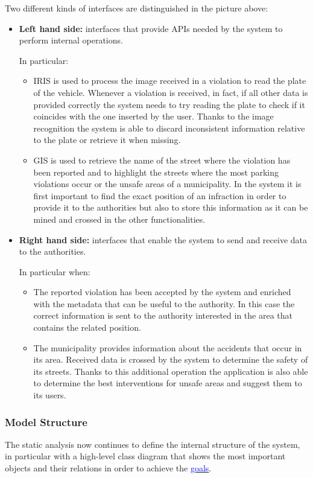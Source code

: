 		Two different kinds of interfaces are distinguished in the picture above:
		\begin{itemize}
			\item \textbf{Left hand side:} interfaces that provide APIs needed by the system to perform internal operations. 
			
			In particular:
			\begin{itemize}
				\item \textsc{IRIS} is used to process the image received in a violation to read the plate of the vehicle. Whenever a violation is received, in fact, if all other data is provided correctly the system needs to try reading the plate to check if it coincides with the one inserted by the user. Thanks to the image recognition the system is able to discard inconsistent information relative to the plate or retrieve it when missing. 
				\item \textsc{GIS} is used to retrieve the name of the street where the violation has been reported and to highlight the streets where the most parking violations occur or the unsafe areas of a municipality. In the system it is first important to find the exact position of an infraction in order to provide it to the authorities but also to store this information as it can be mined and crossed in the other functionalities. 
			\end{itemize}
			\item \textbf{Right hand side:} interfaces that enable the system to send and receive data to the authorities. 
			
			In particular when:
			\begin{itemize}
				\item The reported violation has been accepted by the system and enriched with the metadata that can be useful to the authority. In this case the correct information is sent to the authority interested in the area that contains the related position.
				\item The municipality provides information about the accidents that occur in its area. Received data is crossed by the system to determine the safety of its streets. Thanks to this additional operation the application is also able to determine the best interventions for unsafe areas and suggest them to its users.
			\end{itemize}
		\end{itemize}
	
	\subsubsection{Model Structure}
	The static analysis now continues to define the internal structure of the system, in particular with a high-level class diagram that shows the most important objects and their relations in order to achieve the \hyperref[sec:goals]{\textcolor{blue}{goals}}.\\
	
